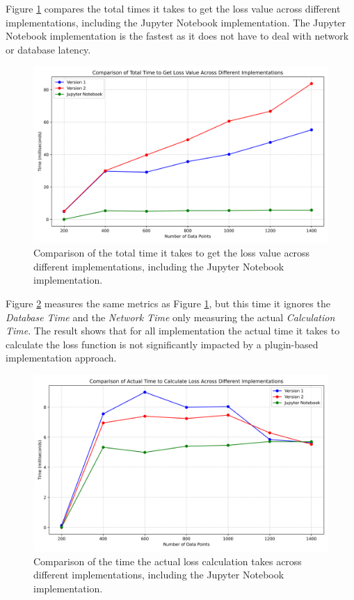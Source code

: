 \documentclass[
  a4paper,  %
  twoside,  %
  bibliography=totoc,
  headsepline,
  cleardoublepage=empty,
  parskip=half,
  draft=false
]{scrbook}
\begin{document}
Figure \ref{fig:coparison_of_of} compares the total times it takes to get the loss value across different implementations, including the Jupyter Notebook implementation.
The Jupyter Notebook implementation is the fastest as it does not have to deal with network or database latency.

\begin{figure}
  \centering
  \includegraphics[width=\textwidth]{graphics/comparison_of_of.png}
  \caption[Total times to get loss value compared]{Comparison of the total time it takes to get the loss value across different implementations, including the Jupyter Notebook implementation.}
  \label{fig:coparison_of_of}
\end{figure}

Figure \ref{fig:time_for_of_calc} measures the same metrics as Figure \ref{fig:coparison_of_of}, but this time it ignores the \emph{Database Time} and the \emph{Network Time} only measuring the actual \emph{Calculation Time}.
The result shows that for all implementation the actual time it takes to calculate the loss function is not significantly impacted by a plugin-based implementation approach.

\begin{figure}
  \centering
  \includegraphics[width=\textwidth]{graphics/time_for_of_calc.png}
  \caption[Times to calculate the loss fucntion compared]{Comparison of the time the actual loss calculation takes across different implementations, including the Jupyter Notebook implementation.}
  \label{fig:time_for_of_calc}
\end{figure}
\end{document}
